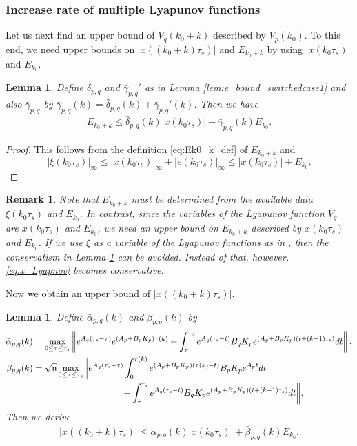 \documentclass[letterpaper, 11pt, onecolumn]{ieeeconf}  \IEEEoverridecommandlockouts
\newtheorem{lemma}[theorem]{Lemma}
\newtheorem{remark}[theorem]{Remark}
\begin{document}
\subsubsection{Increase rate of multiple Lyapunov functions}
Let us next find an upper bound of $V_q(k_0+k)$ described by $V_p(k_0)$.
To this end, we need upper bounds on $|x ((k_0+k)\tau_s)|$
and $E_{k_0+k}$ by using $|x (k_0\tau_s)|$ and $E_{k_0}$.

\begin{lemma}
\label{lem:Ek0+k_bound}
{\em
Define $\bar \delta_{p,q}$ and $\bar \gamma_{p,q}'$ as in 
Lemma \ref{lem:e_bound_switchedcase1} and also
$\bar \gamma_{p,q}$ by 
$\bar \gamma_{p,q}(k) = \bar \delta_{p,q}(k) + \bar \gamma_{p,q}'(k)$.
Then we have
\begin{align}
\label{eq:e_bound_mismatch}
E_{k_0+k} 
\leq \bar \delta_{p,q}(k)|x (k_0\tau_s)| + 
\bar \gamma_{p,q}(k) E_{k_0}.
\end{align}
}
\end{lemma}
\begin{proof}
This follows from the definition \eqref{eq:Ek0_k_def} of $E_{k_0+k}$ and
\[
|\xi(k_0\tau_s)|_{\infty} \leq  |x(k_0\tau_s)|_{\infty} + |e(k_0\tau_s)|_{\infty}
\leq |x(k_0\tau_s)| + E_{k_0}.
\]
\end{proof}

\begin{remark}
Note that $E_{k_0+k}$ must be determined from the available data 
$\xi(k_0\tau_s)$ and $E_{k_0}$. In contrast, 
since the variables of the Lyapunov function $V_q$ are 
$x(k_0\tau_s)$ and $E_{k_0}$,
we need an upper bound on $E_{k_0+k}$ described
by $x(k_0\tau_s)$ and $E_{k_0}$.
If we use $\xi$ as a variable of the Lyapunov functions
as in \cite{Liberzon2014},
then the conservatism in Lemma \ref{lem:Ek0+k_bound}
can be avoided. Instead of that, however, 
\eqref{eq:x_Lyapnov} becomes conservative.
\end{remark}

Now we obtain an upper bound of $|x((k_0+k)\tau_s)|$.
\begin{lemma}
{\em
Define $\bar \alpha_{p,q}(k)$ and $\bar \beta_{p,q}(k)$ by
\begin{align*}
\bar \alpha_{p,q}(k) &=
\max_{0 \leq \tau \leq \tau_s}
\left\|
e^{A_q(\tau_s - \tau)}e^{(A_p+B_pK_p)\tau(k)}
+ 
\int^{\tau_s }_{\tau}
e^{A_q(\tau_s  - t)}
B_qK_p e^{(A_p+B_pK_p) (t + (k-1)\tau_s)} dt
\right\|.  \\
\bar \beta_{p,q} (k)
&=
\sqrt{\sf n} 
\max_{0 \leq \tau \leq \tau_s}
\biggr\|
e^{A_q(\tau_s - \tau)}
\int^{\tau(k)}_{0}
e^{(A_p+B_pK_p)(\tau(k) - t)}
B_pK_p e^{A_p t} dt \notag \\
&\qquad \qquad \qquad \qquad \qquad -
\int^{\tau_s }_{\tau}
e^{A_q(\tau_s  - t)}
B_qK_p e^{(A_p+B_pK_p) (t + (k-1)\tau_s)} dt
\biggr\|.
\end{align*}
Then we derive
\begin{align}
\label{eq:x_bound_mismatch}
|x((k_0+k)\tau_s)| 
\leq \bar \alpha_{p,q}(k) |x(k_0\tau_s)| +
\bar \beta_{p,q}(k) E_{k_0}.
\end{align}
}
\end{lemma}
\end{document}
